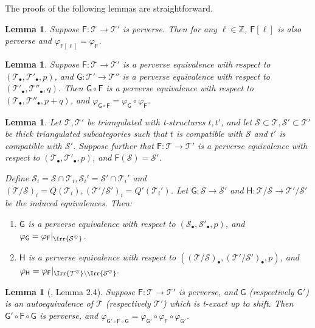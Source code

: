 \documentclass[11pt,reqno]{amsart}
\numberwithin{equation}{section}
\newtheorem{Lemma}[equation]{Lemma}
\theoremstyle{definition}
\theoremstyle{named}
\newcommand{\sF}{\mathsf{F}}
\newcommand{\sG}{\mathsf{G}}
\newcommand{\sH}{\mathsf{H}}
\newcommand{\cS}{\mathcal{S}}
\newcommand{\cT}{\mathcal{T}}
\newcommand{\ZZ}{\mathbb{Z}}
\begin{document}
 The proofs of the following lemmas are straightforward.
 
 \begin{Lemma}\label{lem:pervshift}
 Suppose $\sF:\cT \rightarrow \cT'$ is perverse.  Then for any $\ell\in\ZZ$, $\sF[\ell]$ is also perverse and $\varphi_{\sF[\ell]}=\varphi_\sF$.
 \end{Lemma}
 
 \begin{Lemma}\label{lem:pervcomp}
 Suppose $\sF:\cT \rightarrow \cT'$ is a  perverse equivalence with respect to $(\cT_\bullet, \cT'_\bullet, p)$, and $\sG:\cT' \rightarrow \cT''$ is a  perverse equivalence with respect to $(\cT'_\bullet, \cT''_\bullet, q)$.  Then $\sG\circ \sF$ is a  perverse equivalence with respect to $(\cT_\bullet, \cT''_\bullet, p+q)$, and $\varphi_{\sG\circ \sF}=\varphi_\sG\circ\varphi_\sF$.
 \end{Lemma}
 
\begin{Lemma}\label{lem:quot}
Let $\cT,\cT'$ be triangulated with t-structures $t,t'$, and let $\cS\subset \cT, \cS'\subset \cT'$ be thick triangulated subcategories such that $t$ is compatible with $\cS$ and $t'$ is compatible with $\cS'$.  Suppose further that $\sF:\cT\to\cT'$ is a perverse equivalence with respect to $(\cT_\bullet, \cT'_\bullet, p)$, and $\sF(\cS)=\cS'$.  

Define $\cS_i=\cS\cap \cT_i, \cS_i'=\cS'\cap \cT_i'$ and  $(\cT/\cS)_i=Q(\cT_i), (\cT'/\cS')_i=Q'(\cT_i')$.  Let 
$\sG:\cS\to\cS'$ and $\sH:\cT/\cS \to \cT'/\cS'$ be the induced equivalences.  Then:
\begin{enumerate}
\item $\sG$ is a perverse equivalence with respect to $(\cS_\bullet, \cS'_\bullet,p)$, and $\varphi_{\sG}=\varphi_{\sF}|_{\Irr{\cS^\heartsuit}}$.
\item $\sH$ is a perverse equivalence with respect to $((\cT/\cS)_\bullet,(\cT'/\cS')_\bullet,p)$, and
$
\varphi_{\sH}=\varphi_{\sF}|_{\Irr{\cT^\heartsuit} \setminus \Irr{\cS^\heartsuit}}.
$
\end{enumerate}
\end{Lemma}

\begin{Lemma}[\cite{LosCacti}, Lemma 2.4]\label{lem:texactperv}
Suppose $\sF:\cT \rightarrow \cT'$ is perverse, and $\sG$ (respectively $\sG'$) is an autoequivalence of $\cT$ (respectively $\cT'$) which is t-exact up to shift.  Then $\sG'\circ \sF \circ \sG$ is perverse, and $\varphi_{\sG'\circ \sF \circ \sG}=\varphi_{\sG'}\circ\varphi_{\sF}\circ\varphi_{\sG'}$.  
\end{Lemma}
\end{document}
